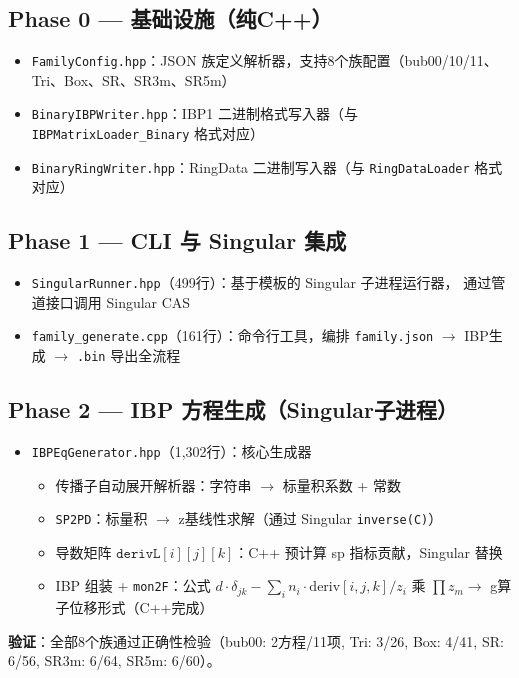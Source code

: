 \documentclass[12pt,a4paper]{article}
\begin{document}
\subsection{Phase 0 — 基础设施（纯C++）}
\begin{itemize}[nosep]
    \item \texttt{FamilyConfig.hpp}：JSON 族定义解析器，支持8个族配置（bub00/10/11、Tri、Box、SR、SR3m、SR5m）
    \item \texttt{BinaryIBPWriter.hpp}：IBP1 二进制格式写入器（与 \texttt{IBPMatrixLoader\_Binary} 格式对应）
    \item \texttt{BinaryRingWriter.hpp}：RingData 二进制写入器（与 \texttt{RingDataLoader} 格式对应）
\end{itemize}

\subsection{Phase 1 — CLI 与 Singular 集成}
\begin{itemize}[nosep]
    \item \texttt{SingularRunner.hpp}（499行）：基于模板的 Singular 子进程运行器，
    通过管道接口调用 Singular CAS
    \item \texttt{family\_generate.cpp}（161行）：命令行工具，编排
    \texttt{family.json} $\to$ IBP生成 $\to$ \texttt{.bin} 导出全流程
\end{itemize}

\subsection{Phase 2 — IBP 方程生成（Singular子进程）}
\begin{itemize}[nosep]
    \item \texttt{IBPEqGenerator.hpp}（1,302行）：核心生成器
    \begin{itemize}[nosep]
        \item 传播子自动展开解析器：字符串 $\to$ 标量积系数 + 常数
        \item \texttt{SP2PD}：标量积 $\to$ z基线性求解（通过 Singular \texttt{inverse(C)}）
        \item 导数矩阵 $\texttt{derivL}[i][j][k]$：C++ 预计算 sp 指标贡献，Singular 替换
        \item IBP 组装 + \texttt{mon2F}：公式
        $d \cdot \delta_{jk} - \sum_i n_i \cdot \text{deriv}[i,j,k] / z_i$
        乘 $\prod z_m \to$ g算子位移形式（C++完成）
    \end{itemize}
\end{itemize}
\textbf{验证}：全部8个族通过正确性检验（bub00: 2方程/11项, Tri: 3/26, Box: 4/41, SR: 6/56, SR3m: 6/64, SR5m: 6/60）。
\end{document}
